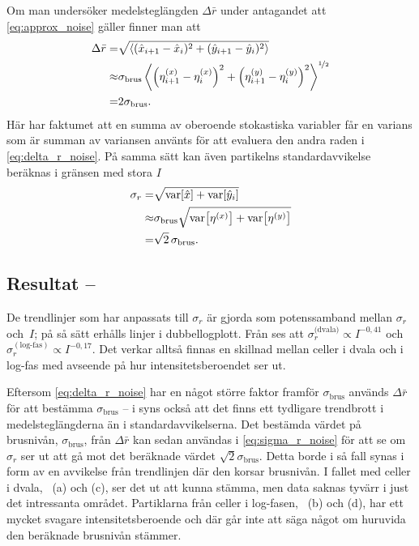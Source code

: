 Om man undersöker medelsteglängden $\Delta{\bar{r}}$ under antagandet att \eqref{eq:approx_noise} gäller finner man att
\begin{equation}\label{eq:delta_r_noise}
\begin{aligned}
\Delta{\bar{r}} =& 
\sqrt{ \ev{(\hat{x}_{i+1}-\hat{x}_{i})^2 + (\hat{y}_{i+1}-\hat{y}_{i})^2 }}
\\
\approx& 
\sigma_\text{brus} \ev{ \left(\eta^{(x)}_{i+1} - \eta^{(x)}_{i}\right)^2 + \left(\eta^{(y)}_{i+1}-\eta^{(y)}_{i}\right)^2 }^{\nicefrac{1}{2}} \\
=&2\sigma_\text{brus}.
\end{aligned}
\end{equation}
Här har faktumet att en summa av oberoende stokastiska variabler får en varians som är summan av variansen använts för att evaluera den andra raden i \eqref{eq:delta_r_noise}.
På samma sätt kan även partikelns standardavvikelse beräknas i gränsen med stora $I$
\begin{equation}\label{eq:sigma_r_noise}
\begin{aligned}
\sigma_r =& 
\sqrt{\text{var}\!\left[\hat{x}\right] + \text{var}\!\left[\hat{y}_{i}\right] }\\
\approx& \sigma_\text{brus} \sqrt{\text{var}\!\left[\eta^{(x)}\right] + \text{var}\!\left[\eta^{(y)}\right] }\\
=&\sqrt{2}\,\sigma_\text{brus}.
\end{aligned}
\end{equation}



\subsection{Resultat -- }
De trendlinjer som har anpassats till $\sigma_r$ är gjorda som potenssamband mellan $\sigma_r$ och~$I$; på så sätt erhålls linjer i dubbellogplott. Från  ses att $\sigma_r^{\text{(dvala)}} \propto I^{-0,41}$ och $\sigma_r^{(\text{log-fas})} \propto I^{-0,17}$. Det verkar alltså finnas en skillnad mellan celler i dvala och i log-fas med avseende på hur intensitetsberoendet ser ut.

Eftersom \eqref{eq:delta_r_noise} har en något större faktor framför $\sigma_\text{brus}$ används $\Delta{\bar{r}}$ för att bestämma $\sigma_\text{brus}$ -- i  syns också att det finns ett tydligare trendbrott i medelsteglängderna än i standardavvikelserna. Det bestämda värdet på brusnivån, $\sigma_\text{brus}$, från $\Delta{\bar{r}}$ kan sedan användas i \eqref{eq:sigma_r_noise} för att se om $\sigma_r$ ser ut att gå mot det beräknade värdet $\sqrt{2}\sigma_\text{brus}$. Detta borde i så fall synas i form av en avvikelse från trendlinjen där den korsar brusnivån.
I fallet med celler i dvala, ~(a) och (c), ser det ut att kunna stämma, men data saknas tyvärr i just det intressanta området. Partiklarna från celler i log-fasen, ~(b) och (d), har ett mycket svagare intensitetsberoende och där går inte att säga något om huruvida den beräknade brusnivån stämmer. 

